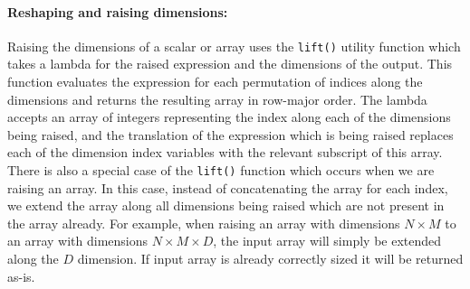 
 
\paragraph{Reshaping and raising dimensions:}
Raising the dimensions of a scalar or array uses the \texttt{lift()} utility function which takes a lambda for the raised expression and the dimensions of the output.  This function evaluates the expression for each permutation of indices along the dimensions and returns the resulting array in row-major order.  The lambda accepts an array of integers representing the index along each of the dimensions being raised, and the translation of the expression which is being raised replaces each of the dimension index variables with the relevant subscript of this array.  There is also a special case of the \texttt{lift()} function which occurs when we are raising an array.  In this case, instead of concatenating the array for each index, we extend the array along all dimensions being raised which are not present in the array already.  For example, when raising an array with dimensions $N \times M$ to an array with dimensions $N \times M \times D$, the input array will simply be extended along the $D$ dimension.  If input array is already correctly sized it will be returned as-is.
 

